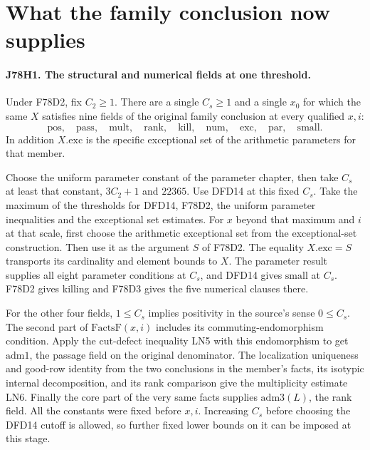\section{What the family conclusion now supplies}

\paragraph{J78H1. The structural and numerical fields at one threshold.}
Under F78D2, fix $C_2\ge1$. There are a single $C_s\ge1$
and a single $x_0$ for which the same $X$ satisfies nine fields
of the original family conclusion at every qualified $x,i$:
\[
 \mathrm{pos},\quad\mathrm{pass},\quad\mathrm{mult},\quad
 \mathrm{rank},\quad\mathrm{kill},\quad\mathrm{num},\quad
 \mathrm{exc},\quad\mathrm{par},\quad\mathrm{small}.
\]
In addition $X.\mathrm{exc}$ is the specific exceptional set of
the arithmetic parameters for that member.

Choose the uniform parameter constant of the parameter chapter, then
take $C_s$ at least that constant, $3C_2+1$ and $22365$.
Use DFD14 at this fixed $C_s$. Take the maximum of the thresholds for
DFD14, F78D2, the uniform parameter inequalities and the exceptional
set estimates. For $x$ beyond that maximum and $i$ at that scale,
first choose the arithmetic exceptional set from the exceptional-set
construction. Then use it as the argument $S$ of F78D2.
The equality $X.\mathrm{exc}=S$ transports its cardinality and element
bounds to $X$. The parameter result supplies all eight parameter
conditions at $C_s$, and DFD14 gives $\mathrm{small}$ at $C_s$.
F78D2 gives killing and F78D3 gives the five numerical clauses there.

For the other four fields, $1\le C_s$ implies positivity in the
source's sense $0\le C_s$. The second part of
$\mathrm{FactsF}(x,i)$ includes its commuting-endomorphism condition.
Apply the cut-defect inequality LN5 with this endomorphism to get
$\mathrm{adm1}$, the passage field on the original denominator. The
localization uniqueness and good-row identity from the two conclusions
in the member's facts, its isotypic internal decomposition, and its
rank comparison give the multiplicity estimate LN6. Finally
the core part of the very same facts supplies $\mathrm{adm3}(L)$,
the rank field. All the constants were fixed before $x,i$.
Increasing $C_s$ before choosing the DFD14 cutoff is allowed, so
further fixed lower bounds on it can be imposed at this stage.


